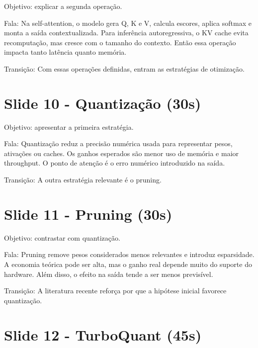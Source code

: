 Objetivo: explicar a segunda operação.






Fala: Na self-attention, o modelo gera Q, K e V, calcula escores, aplica softmax e monta a saída contextualizada. Para inferência autoregressiva, o KV cache evita recomputação, mas cresce com o tamanho do contexto. Então essa operação impacta tanto latência quanto memória.




Transição: Com essas operações definidas, entram as estratégias de otimização.



\section{Slide 10 - Quantização (30s)}


Objetivo: apresentar a primeira estratégia.






Fala: Quantização reduz a precisão numérica usada para representar pesos, ativações ou caches. Os ganhos esperados são menor uso de memória e maior throughput. O ponto de atenção é o erro numérico introduzido na saída.




Transição: A outra estratégia relevante é o pruning.



\section{Slide 11 - Pruning (30s)}


Objetivo: contrastar com quantização.






Fala: Pruning remove pesos considerados menos relevantes e introduz esparsidade. A economia teórica pode ser alta, mas o ganho real depende muito do suporte do hardware. Além disso, o efeito na saída tende a ser menos previsível.




Transição: A literatura recente reforça por que a hipótese inicial favorece quantização.



\section{Slide 12 - TurboQuant (45s)}


